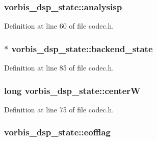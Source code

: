 \subsubsection[{\texorpdfstring{analysisp}{analysisp}}]{ vorbis\+\_\+dsp\+\_\+state\+::analysisp}\hypertarget{structvorbis__dsp__state_a9b983a6901a311f2d354f2b6c51cf93b}{}\label{structvorbis__dsp__state_a9b983a6901a311f2d354f2b6c51cf93b}


Definition at line 60 of file codec.\+h.

\subsubsection[{\texorpdfstring{backend\+\_\+state}{backend_state}}]{$\ast$ vorbis\+\_\+dsp\+\_\+state\+::backend\+\_\+state}\hypertarget{structvorbis__dsp__state_a97ff4df8d289e5e3968029e47d7f8162}{}\label{structvorbis__dsp__state_a97ff4df8d289e5e3968029e47d7f8162}


Definition at line 85 of file codec.\+h.

\subsubsection[{\texorpdfstring{centerW}{centerW}}]{\setlength{\rightskip}{0pt plus 5cm}long vorbis\+\_\+dsp\+\_\+state\+::centerW}\hypertarget{structvorbis__dsp__state_a241d3dc3b6c931e93ce53cbf69282350}{}\label{structvorbis__dsp__state_a241d3dc3b6c931e93ce53cbf69282350}


Definition at line 75 of file codec.\+h.

\subsubsection[{\texorpdfstring{eofflag}{eofflag}}]{ vorbis\+\_\+dsp\+\_\+state\+::eofflag}\hypertarget{structvorbis__dsp__state_af48b32e7555d54a5d18a24385f1296d0}{}\label{structvorbis__dsp__state_af48b32e7555d54a5d18a24385f1296d0}


